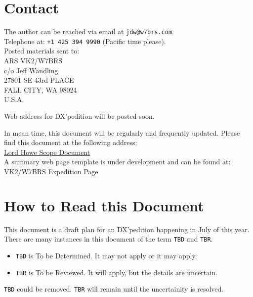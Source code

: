 \documentclass[11pt]{article}
\begin{document}
\section*{Contact}
The author can be reached via email at {\texttt{jdw@w7brs.com}}.\\[1cm]
Telephone at: {\texttt{+1 425 394 9990}} (Pacific time please).\\[5mm]
Posted materials sent to:\\[4mm]
ARS VK2/W7BRS\\
c/o Jeff Wandling\\
27801 SE 43rd PLACE\\
FALL CITY, WA 98024\\
U.S.A.\\
\par
\noindent
Web address for DX'pedition will be posted soon.
\par
\noindent
In mean time, this document will be regularly and frequently updated.
Please find this document at the following address:\\[3mm]
\noindent
\href{http://w7brs.com/vk9l/scope.pdf}{Lord Howe Scope Document}\\[3mm]
\noindent
A summary web page template is under development and can be found at:\\[3mm]
\noindent
\href{http://w7brs.com/vk9l}{VK2/W7BRS Expedition Page}\\[3mm]
\par
\newpage

\tableofcontents
\listoffigures
\listoftables

\newpage
\section{How to Read this Document}

This document is a draft plan for an DX'pedition happening in July
of this year.   There are many instances in this document of the term
{\texttt{TBD}} and {\texttt{TBR}}. 
\begin{itemize}
\item {\texttt{TBD}} is To be Determined.  It may not apply or it may apply.
\item {\texttt{TBR}} is To be Reviewed. It will apply, but the details
are uncertain.
\end{itemize}

{\texttt{TBD}} could be removed. {\texttt{TBR}} will remain until the
uncertainity is resolved.
\end{document}
